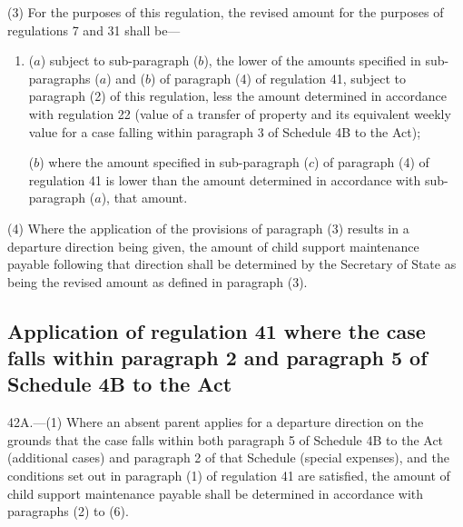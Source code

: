 \documentclass[12pt,a4paper]{article}
\begin{document}
(3) For the purposes of this regulation, the revised amount for the purposes of regulations 7 and 31 shall be—
\begin{enumerate}\item[]
($a$) subject to sub-paragraph ($b$), the lower of the amounts specified in sub-paragraphs ($a$) and ($b$) of paragraph (4) of regulation 41, subject to paragraph (2) of this regulation, less the amount determined in accordance with regulation 22 (value of a transfer of property and its equivalent weekly value for a case falling within paragraph 3 of Schedule 4B to the Act);

($b$) where the amount specified in sub-paragraph ($c$) of paragraph (4) of regulation 41 is lower than the amount determined in accordance with sub-paragraph ($a$), that amount.
\end{enumerate}

(4) Where the application of the provisions of paragraph (3) results in a departure direction being given, the amount of child support maintenance payable following that direction shall be 
determined by 
  the Secretary of State  %
as being  %
the revised amount as defined in paragraph (3).


\subsection[42A. Application of regulation 41 where the case falls within paragraph 2 and paragraph 5 of Schedule 4B to the Act]{Application of regulation 41 where the case falls within paragraph 2 and paragraph 5 of Schedule 4B to the Act}

42A.—(1) Where an absent parent applies for a departure direction on the grounds that the case falls within both paragraph 5 of Schedule 4B to the Act (additional cases) and paragraph 2 of that Schedule (special expenses), and the conditions set out in paragraph (1) of regulation 41 are satisfied, the amount of child support maintenance payable shall be determined in accordance with paragraphs (2) to (6).
\end{document}
